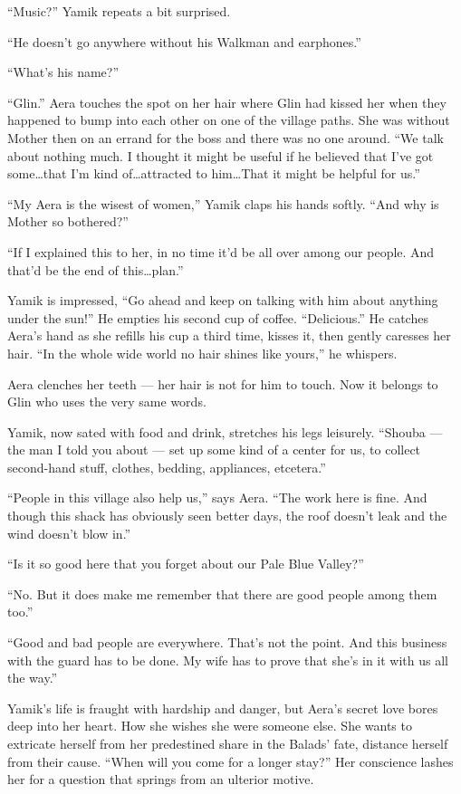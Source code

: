 \documentclass[twoside,11pt,openany]{book}
\begin{document}
``Music?'' Yamik repeats a bit surprised.

``He doesn't go anywhere without his Walkman and earphones.''

``What's his name?''

``Glin.'' Aera touches the spot on her hair where Glin had kissed her when they happened to bump into each other on
one of the village paths. She was without Mother then on an errand for the boss and there was no one around. ``We talk
about nothing much. I thought it might be useful if he believed that I've got some{\ldots}that I'm kind of{\ldots}attracted to him{\ldots}That it might be helpful for us.''

``My Aera is the wisest of women,'' Yamik claps his hands softly. ``And why is Mother so bothered?''

``If I explained this to her, in no time it'd be all over among our people. And that'd be the end of this{\ldots}plan.''

Yamik is impressed, ``Go ahead and keep on talking with him about anything under the sun!'' He empties his second cup of
coffee. ``Delicious.'' He catches Aera's hand as she refills his cup a third time, kisses it, then gently caresses
her hair. {}``In the whole wide world no hair shines like yours,{}'' he whispers.

Aera clenches her teeth --- her hair is not for him to touch. Now it belongs to Glin who uses the very same words.

Yamik, now sated with food and drink, stretches his legs leisurely. ``Shouba --- the man I told you about --- set up some
kind of a center for us, to collect second-hand stuff, clothes, bedding, appliances, etcetera.''

``People in this village also help us,'' says Aera. ``The work here is fine. And though this shack has obviously seen
better days, the roof doesn't leak and the wind doesn't blow in.''

``Is it so good here that you forget about our Pale Blue Valley?''

``No. But it does make me remember that there are good people among them too.''

``Good and bad people are everywhere. That's not the point. And this business with the guard has to be done. My wife
has to prove that she's in it with us all the way.''

Yamik's life is fraught with hardship and danger, but Aera's secret love bores deep into her heart. How she wishes she
were someone else. She wants to extricate herself from her predestined share in the Balads{'} fate, distance herself from
their cause. ``When will you come for a longer stay?'' Her conscience lashes her for a question that springs from an
ulterior motive.
\end{document}
